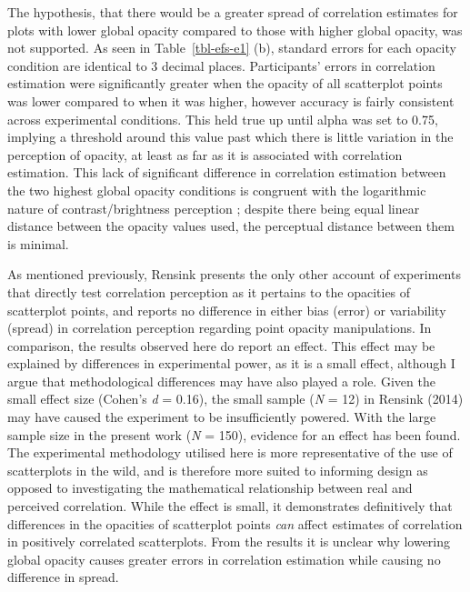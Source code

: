 \documentclass[../main.tex]{subfiles}
\begin{document}
The hypothesis, that there would be a greater spread of correlation
estimates for plots with lower global opacity compared to those with
higher global opacity, was not supported. As seen in
Table~\ref{tbl-efs-e1} (b), standard errors for each opacity condition
are identical to 3 decimal places. Participants' errors in correlation
estimation were significantly greater when the opacity of all
scatterplot points was lower compared to when it was higher, however
accuracy is fairly consistent across experimental conditions. This held
true up until alpha was set to 0.75, implying a threshold around this
value past which there is little variation in the perception of opacity,
at least as far as it is associated with correlation estimation. This
lack of significant difference in correlation estimation between the two
highest global opacity conditions is congruent with the logarithmic
nature of contrast/brightness perception
\cite{fechner_1948, varshney_2013}; despite there being equal linear
distance between the opacity values used, the perceptual distance
between them is minimal.

As mentioned previously, Rensink \cite{rensink_2012, rensink_2014}
presents the only other account of experiments that directly test
correlation perception as it pertains to the opacities of scatterplot
points, and reports no difference in either bias (error) or variability
(spread) in correlation perception regarding point opacity
manipulations. In comparison, the results observed here do report an
effect. This effect may be explained by differences in experimental
power, as it is a small effect, although I argue that methodological
differences may have also played a role. Given the small effect size
(Cohen's \emph{d} = 0.16), the small sample (\emph{N} = 12) in Rensink
(2014) \cite{rensink_2014} may have caused the experiment to be
insufficiently powered. With the large sample size in the present work
(\emph{N} = 150), evidence for an effect has been found. The
experimental methodology utilised here is more representative of the use
of scatterplots in the wild, and is therefore more suited to informing
design as opposed to investigating the mathematical relationship between
real and perceived correlation. While the effect is small, it
demonstrates definitively that differences in the opacities of
scatterplot points \emph{can} affect estimates of correlation in
positively correlated scatterplots. From the results it is unclear why
lowering global opacity causes greater errors in correlation estimation
while causing no difference in spread.
\end{document}

